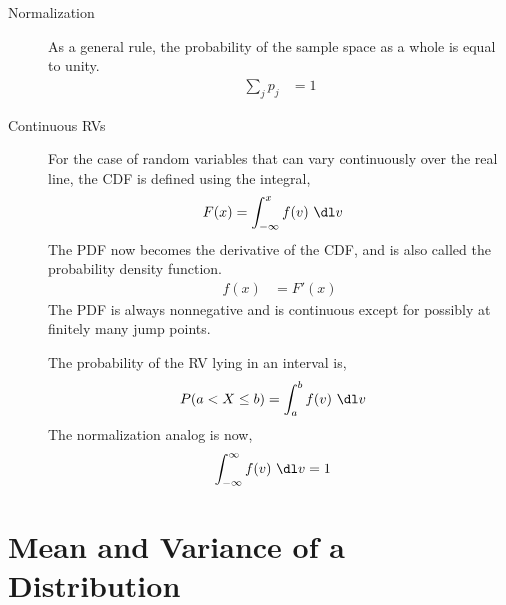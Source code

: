 \begin{description}
    \item[Normalization] As a general rule, the probability of the sample space as a
          whole is equal to unity.
          \begin{align}
              \sum_{j} p_j & = 1
          \end{align}

    \item[Continuous RVs] For the case of random variables that can vary continuously
          over the real line, the CDF is defined using the integral,
          \begin{align}
              F(x) & = \int_{-\infty}^{x} f(v)\ \dl v
          \end{align}
          The PDF now becomes the derivative of the CDF, and is also called the
          probability density function.
          \begin{align}
              f(x) & = F'(x)
          \end{align}
          The PDF is always nonnegative and is continuous except for possibly at
          finitely many jump points. \par
          The probability of the RV lying in an interval is,
          \begin{align}
              P(a < X \leq b) & = \int_{a}^{b} f(v)\ \dl v
          \end{align}
          The normalization analog is now,
          \begin{align}
              \int_{-\infty}^{\infty} f(v)\ \dl v & = 1
          \end{align}
\end{description}

\section{Mean and Variance of a Distribution}


